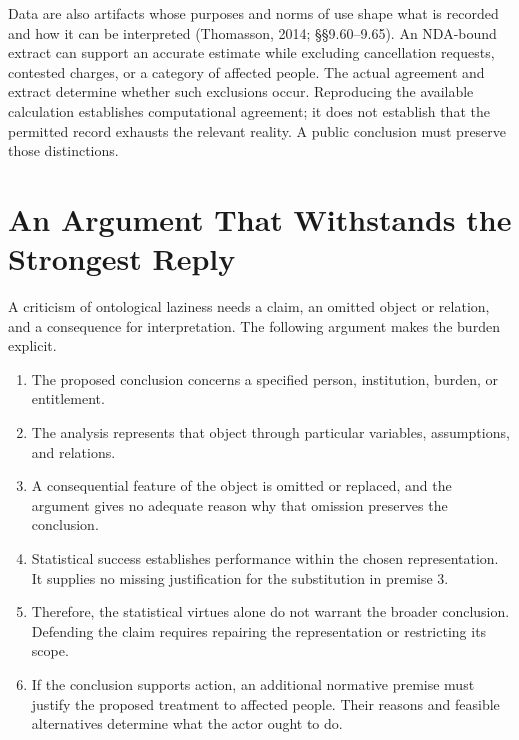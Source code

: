 Data are also artifacts whose purposes and norms of use shape what is
recorded and how it can be interpreted (Thomasson, 2014; §§9.60--9.65).
An NDA-bound extract can support an accurate estimate while excluding
cancellation requests, contested charges, or a category of affected
people. The actual agreement and extract determine whether such
exclusions occur. Reproducing the available calculation establishes
computational agreement; it does not establish that the permitted record
exhausts the relevant reality. A public conclusion must preserve those
distinctions.


\hypertarget{M09-an-argument-that-withstands-the-strongest-reply}{%
\section{An Argument That Withstands the Strongest
Reply}\label{M09-an-argument-that-withstands-the-strongest-reply}}

\noindent \noindent A criticism of ontological laziness needs a claim, an omitted
object or relation, and a consequence for interpretation. The following
argument makes the burden explicit.

\begin{enumerate}
\def\labelenumi{\arabic{enumi}.}
\tightlist
\item
  The proposed conclusion concerns a specified person, institution,
  burden, or entitlement.
\item
  The analysis represents that object through particular variables,
  assumptions, and relations.
\item
  A consequential feature of the object is omitted or replaced, and the
  argument gives no adequate reason why that omission preserves the
  conclusion.
\item
  Statistical success establishes performance within the chosen
  representation. It supplies no missing justification for the
  substitution in premise 3.
\item
  Therefore, the statistical virtues alone do not warrant the broader
  conclusion. Defending the claim requires repairing the representation
  or restricting its scope.
\item
  If the conclusion supports action, an additional normative premise
  must justify the proposed treatment to affected people. Their reasons
  and feasible alternatives determine what the actor ought to do.
\end{enumerate}

